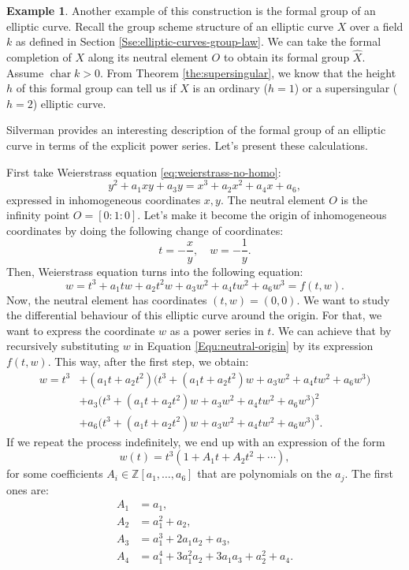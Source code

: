 \documentclass{report}
\DeclareMathOperator{\chara}{char}
\theoremstyle{definition}
\newtheorem{example}[equation]{Example}
\begin{document}
\begin{example}
Another example of this construction is the formal group of an elliptic curve. Recall the group scheme structure of an elliptic curve $X$ over a field $k$ as defined in Section \ref{Sse:elliptic-curves-group-law}. We can take the formal completion of $X$ along its neutral element $O$ to obtain its formal group $\widehat{X}$. Assume $\chara k>0$. From Theorem \ref{the:supersingular}, we know that the height $h$ of this formal group can tell us if $X$ is an ordinary ($h=1$) or a supersingular ($h=2$) elliptic curve.

Silverman \cite[Section~IV.1]{silverman1986arithmetic} provides an interesting description of the formal group of an elliptic curve in terms of the explicit power series. Let's present these calculations.

First take Weierstrass equation \eqref{eq:weierstrass-no-homo}:
\[y^2+a_1xy+a_3y=x^3+a_2x^2+a_4x+a_6,\]
expressed in inhomogeneous coordinates $x,y$. The neutral element $O$ is the infinity point $O=[0:1:0]$. Let's make it become the origin of inhomogeneous coordinates by doing the following change of coordinates:
\[t=-\frac{x}{y},\quad w=-\frac{1}{y}.\]
Then, Weierstrass equation turns into the following equation:
\begin{equation}
\label{Equ:neutral-origin}
w=t^3+a_1tw+a_2t^2w+a_3w^2+a_4tw^2+a_6w^3=f(t,w).
\end{equation}
Now, the neutral element has coordinates $(t,w)=(0,0)$. We want to study the differential behaviour of this elliptic curve around the origin. For that, we want to express the coordinate $w$ as a power series in $t$. We can achieve that by recursively substituting $w$ in Equation \eqref{Equ:neutral-origin} by its expression $f(t,w)$. This way, after the first step, we obtain:
\begin{align*}
w=t^3&+(a_1t+a_2t^2)\big(t^3+(a_1t+a_2t^2)w+a_3w^2+a_4tw^2+a_6w^3\big)\\
&+a_3\big(t^3+(a_1t+a_2t^2)w+a_3w^2+a_4tw^2+a_6w^3\big)^2\\
&+a_6\big(t^3+(a_1t+a_2t^2)w+a_3w^2+a_4tw^2+a_6w^3\big)^3.
\end{align*}
If we repeat the process indefinitely, we end up with an expression of the form
\[w(t)=t^3(1+A_1t+A_2t^2+\cdots),\]
for some coefficients $A_i\in\mathbb{Z}[a_1,\ldots,a_6]$ that are polynomials on the $a_j$. The first ones are:
\begin{align*}
A_1&=a_1,\\
A_2&=a_1^2+a_2,\\
A_3&=a_1^3+2a_1a_2+a_3,\\
A_4&=a_1^4+3a_1^2a_2+3a_1a_3+a_2^2+a_4.
\end{align*}


\end{example}
\end{document}
